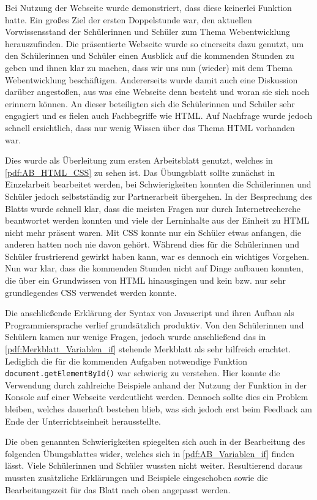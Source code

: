 Bei Nutzung der Webseite wurde demonstriert, dass diese keinerlei Funktion hatte.
Ein großes Ziel der ersten Doppelstunde war, den aktuellen Vorwissensstand der Schülerinnen und Schüler zum Thema Webentwicklung herauszufinden.
Die präsentierte Webseite wurde so einerseits dazu genutzt, um den Schülerinnen und Schüler einen Ausblick auf die kommenden Stunden zu geben und ihnen klar zu machen, dass wir uns nun (wieder) mit dem Thema Webentwicklung beschäftigen.
Andererseits wurde damit auch eine Diskussion darüber angestoßen, aus was eine Webseite denn besteht und woran sie sich noch erinnern können.
An dieser beteiligten sich die Schülerinnen und Schüler sehr engagiert und es fielen auch Fachbegriffe wie HTML.
Auf Nachfrage wurde jedoch schnell ersichtlich, dass nur wenig Wissen über das Thema HTML vorhanden war.

Dies wurde als Überleitung zum ersten Arbeitsblatt genutzt, welches in \autoref{pdf:AB_HTML_CSS} zu sehen ist.
Das Übungsblatt sollte zunächst in Einzelarbeit bearbeitet werden, bei Schwierigkeiten konnten die Schülerinnen und Schüler jedoch selbstständig zur Partnerarbeit übergehen.
In der Besprechung des Blatts wurde schnell klar, dass die meisten Fragen nur durch Internetrecherche beantwortet werden konnten und viele der Lerninhalte aus der Einheit zu HTML nicht mehr präsent waren.
Mit CSS konnte nur ein Schüler etwas anfangen, die anderen hatten noch nie davon gehört.
Während dies für die Schülerinnen und Schüler frustrierend gewirkt haben kann, war es dennoch ein wichtiges Vorgehen.
Nun war klar, dass die kommenden Stunden nicht auf Dinge aufbauen konnten, die über ein Grundwissen von HTML hinausgingen und kein bzw. nur sehr grundlegendes CSS verwendet werden konnte.

Die anschließende Erklärung der Syntax von Javascript und ihren Aufbau als Programmiersprache verlief grundsätzlich produktiv.
Von den Schülerinnen und Schülern kamen nur wenige Fragen, jedoch wurde anschließend das in \autoref{pdf:Merkblatt_Variablen_if} stehende Merkblatt als sehr hilfreich erachtet.
Lediglich die für die kommenden Aufgaben notwendige Funktion \texttt{document.getElementById()} war schwierig zu verstehen.
Hier konnte die Verwendung durch zahlreiche Beispiele anhand der Nutzung der Funktion in der Konsole auf einer Webseite verdeutlicht werden.
Dennoch sollte dies ein Problem bleiben, welches dauerhaft bestehen blieb, was sich jedoch erst beim Feedback am Ende der Unterrichtseinheit herausstellte.

Die oben genannten Schwierigkeiten spiegelten sich auch in der Bearbeitung des folgenden Übungsblattes wider, welches sich in \autoref{pdf:AB_Variablen_if} finden lässt.
Viele Schülerinnen und Schüler wussten nicht weiter.
Resultierend daraus mussten zusätzliche Erklärungen und Beispiele eingeschoben sowie die Bearbeitungszeit für das Blatt nach oben angepasst werden.


